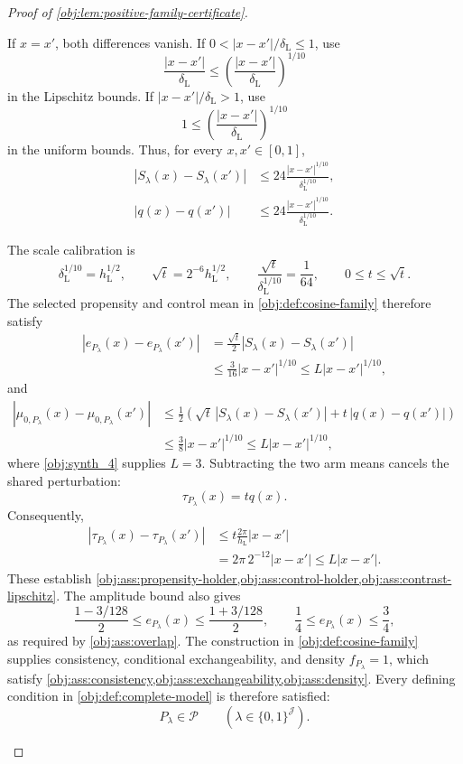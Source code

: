 \documentclass[11pt]{article}
\begin{document}
\begin{proof}[Proof of \cref{obj:lem:positive-family-certificate}]
\begin{enumerate}
If \(x=x'\), both differences vanish. If
\(0<|x-x'|/\delta_{\mathrm L}\le1\), use
\[
\frac{|x-x'|}{\delta_{\mathrm L}}
\le
\left(\frac{|x-x'|}{\delta_{\mathrm L}}\right)^{1/10}
\]
in the Lipschitz bounds. If
\(|x-x'|/\delta_{\mathrm L}>1\), use
\[
1\le
\left(\frac{|x-x'|}{\delta_{\mathrm L}}\right)^{1/10}
\]
in the uniform bounds. Thus, for every \(x,x'\in[0,1]\),
\[
\begin{aligned}
|S_\lambda(x)-S_\lambda(x')|
&\le24\frac{|x-x'|^{1/10}}{\delta_{\mathrm L}^{1/10}},\\
|q(x)-q(x')|
&\le24\frac{|x-x'|^{1/10}}{\delta_{\mathrm L}^{1/10}}.
\end{aligned}
\]

The scale calibration is
\[
\delta_{\mathrm L}^{1/10}=h_{\mathrm L}^{1/2},
\qquad
\sqrt t=2^{-6}h_{\mathrm L}^{1/2},
\qquad
\frac{\sqrt t}{\delta_{\mathrm L}^{1/10}}=\frac1{64},
\qquad
0\le t\le\sqrt t.
\]
The selected propensity and control mean in
\cref{obj:def:cosine-family} therefore satisfy
\[
\begin{aligned}
|e_{P_\lambda}(x)-e_{P_\lambda}(x')|
&=\frac{\sqrt t}{2}|S_\lambda(x)-S_\lambda(x')|\\
&\le\frac3{16}|x-x'|^{1/10}
\le L|x-x'|^{1/10},
\end{aligned}
\]
and
\[
\begin{aligned}
|\mu_{0,P_\lambda}(x)-\mu_{0,P_\lambda}(x')|
&\le\frac12\left(
 \sqrt t\,|S_\lambda(x)-S_\lambda(x')|
 +t\,|q(x)-q(x')|\right)\\
&\le\frac38|x-x'|^{1/10}
\le L|x-x'|^{1/10},
\end{aligned}
\]
where \cref{obj:synth_4} supplies \(L=3\).
Subtracting the two arm means cancels the shared perturbation:
\[
\tau_{P_\lambda}(x)=tq(x).
\]
Consequently,
\[
\begin{aligned}
|\tau_{P_\lambda}(x)-\tau_{P_\lambda}(x')|
&\le t\frac{2\pi}{h_{\mathrm L}}|x-x'|\\
&=2\pi\,2^{-12}|x-x'|
\le L|x-x'|.
\end{aligned}
\]
These establish
\cref{obj:ass:propensity-holder,obj:ass:control-holder,obj:ass:contrast-lipschitz}.
The amplitude bound also gives
\[
\frac{1-3/128}{2}\le e_{P_\lambda}(x)
\le\frac{1+3/128}{2},
\qquad
\frac14\le e_{P_\lambda}(x)\le\frac34,
\]
as required by \cref{obj:ass:overlap}.
The construction in \cref{obj:def:cosine-family} supplies consistency,
conditional exchangeability, and density \(f_{P_\lambda}=1\), which
satisfy
\cref{obj:ass:consistency,obj:ass:exchangeability,obj:ass:density}.
Every defining condition in \cref{obj:def:complete-model} is therefore
satisfied:
\[
P_\lambda\in\mathcal P\qquad
(\lambda\in\{0,1\}^{\mathcal J}).
\]


\end{enumerate}
\end{proof}
\end{document}
